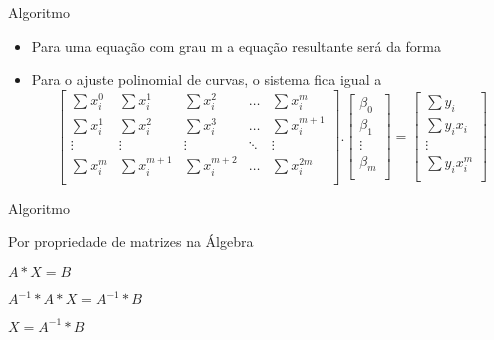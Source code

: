 \documentclass[10pt]{beamer}
\begin{document}
\begin{frame}[fragile]{Algoritmo}
  \begin{itemize}
  \item Para uma equação com grau m a equação resultante será da forma 
  \newline
  \item Para o ajuste polinomial de curvas, o sistema fica
igual a   
  \newline
  \[
    \begin{bmatrix}
      \sum{x_{i}^{0}} & \sum{x_{i}^{1}} & \sum{x_{i}^{2}} & \dots  & \sum{x_{i}^{m}} \\
      \sum{x_{i}^{1}} & \sum{x_{i}^{2}} & \sum{x_{i}^{3}} & \dots & \sum{x_{i}^{m+1}}\\
      \vdots & \vdots & \vdots & \ddots & \vdots \\
      \sum{x_{i}^{m}} & \sum{x_{i}^{m+1}} & \sum{x_{i}^{m+2}} & \dots  & \sum{x_{i}^{2m}} \\
    \end{bmatrix}
    .
    \begin{bmatrix}
      \beta_0 \\
      \beta_1 \\
      \vdots  \\
      \beta_m \\
    \end{bmatrix}
    =
    \begin{bmatrix}
      \sum{y_{i}} \\
      \sum{y_{i}x_{i}}\\
      \vdots \\
      \sum{y_{i}x_{i}^{m}} \\
    \end{bmatrix}
    \]
  \newline
  \end{itemize}
\end{frame}

\begin{frame}[fragile]{Algoritmo}
  
  Por propriedade de matrizes na Álgebra 

  {\centering
    $A * X = B$\par
    $A^{-1} * A * X = A^{-1} * B$\par
    $X = A^{-1} * B$\par
  }

\end{frame}
\end{document}
